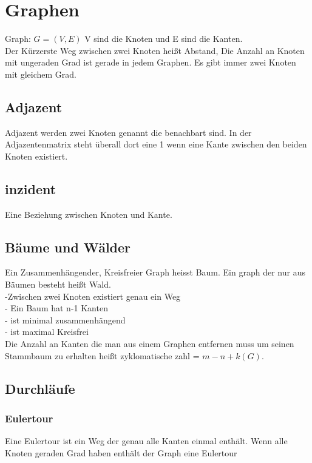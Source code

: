 \documentclass[a4paper]{scrartcl}
\begin{document}
\section{Graphen}
Graph: $G=(V,E)$ V sind die Knoten und E sind die Kanten.\\
Der Kürzerste Weg zwischen zwei Knoten heißt Abstand, Die Anzahl an Knoten mit ungeraden Grad ist gerade in jedem Graphen. Es gibt immer zwei Knoten mit gleichem Grad.\\
\subsection{Adjazent}
Adjazent werden zwei Knoten genannt die benachbart sind.
In der Adjazentenmatrix steht überall dort eine 1 wenn eine Kante zwischen den beiden Knoten existiert.\\
\subsection{inzident}
Eine Beziehung zwischen Knoten und Kante.\\

\subsection{Bäume und Wälder}
Ein Zusammenhängender, Kreisfreier Graph heisst Baum. Ein graph der nur aus Bäumen besteht heißt Wald.\\
-Zwischen zwei Knoten existiert genau ein Weg\\
- Ein Baum hat n-1 Kanten\\
- ist minimal zusammenhängend\\
- ist maximal Kreisfrei\\

Die Anzahl an Kanten die man aus einem Graphen entfernen muss um seinen Stammbaum zu erhalten heißt zyklomatische zahl = $m-n+k(G)$.\\

\subsection{Durchläufe}
\subsubsection{Eulertour}
Eine Eulertour ist ein Weg der genau alle Kanten einmal enthält. Wenn alle Knoten geraden Grad haben enthält der Graph eine Eulertour\\
\end{document}
